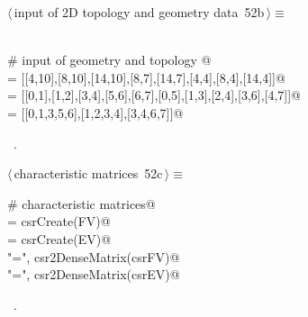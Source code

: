\documentclass[11pt,oneside]{article}    %
\begin{document}
\begin{flushleft} \small \label{scrap86}
\protect{}$\langle\,$input of 2D topology and geometry data\nobreak\ {\footnotesize 52b}$\,\rangle\equiv$
\vspace{-1ex}
\begin{list}{}{} \item
\mbox{}\verb@@\\
\mbox{}\verb@# input of geometry and topology  @\\
\mbox{} = [[4,10],[8,10],[14,10],[8,7],[14,7],[4,4],[8,4],[14,4]]@\\
\mbox{}\verb@EV = [[0,1],[1,2],[3,4],[5,6],[6,7],[0,5],[1,3],[2,4],[3,6],[4,7]]@\\
\mbox{}\verb@FV = [[0,1,3,5,6],[1,2,3,4],[3,4,6,7]]@\\
\mbox{}\verb@@{\NWsep}
\end{list}
\vspace{-1ex}
\footnotesize\addtolength{\baselineskip}{-1ex}
\begin{list}{}{\setlength{\itemsep}{-\parsep}\setlength{\itemindent}{-\leftmargin}}
\item \NWtxtMacroRefIn\ .
\end{list}
\end{flushleft}

\begin{flushleft} \small \label{scrap87}
\protect{}$\langle\,$characteristic matrices\nobreak\ {\footnotesize 52c}$\,\rangle\equiv$
\vspace{-1ex}
\begin{list}{}{} \item
\mbox{}\verb@# characteristic matrices@\\
\mbox{}\verb@csrFV = csrCreate(FV)@\\
\mbox{}\verb@csrEV = csrCreate(EV)@\\
\mbox{}\verb@print "\nFV =\n", csr2DenseMatrix(csrFV)@\\
\mbox{}\verb@print "\nEV =\n", csr2DenseMatrix(csrEV)@\\
\mbox{}\verb@@{\NWsep}
\end{list}
\vspace{-1ex}
\footnotesize\addtolength{\baselineskip}{-1ex}
\begin{list}{}{\setlength{\itemsep}{-\parsep}\setlength{\itemindent}{-\leftmargin}}
\item \NWtxtMacroRefIn\ .
\end{list}
\end{flushleft}
\end{document}
